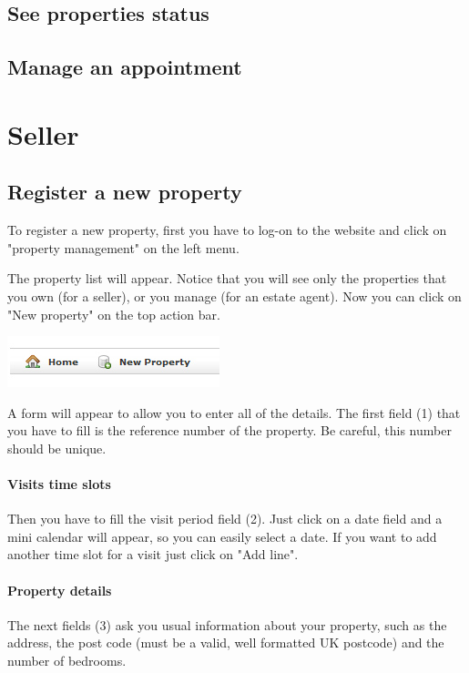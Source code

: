 \documentclass[a4paper,12pt]{article}
\begin{document}
\subsection{See properties status}
\subsection{Manage an appointment}

\section{Seller}
\subsection{Register a new property}
To register a new property, first you have to log-on to the website and click on "property management" on the left menu.

The property list will appear. Notice that you will see only the properties that you own (for a seller), or you manage (for an estate agent).
Now you can click on "New property" on the top action bar.
\begin{center}
\includegraphics[scale=0.7]{pics/new_property.jpg}
\end{center}


A form will appear to allow you to enter all of the details. The first field (1) that you have to fill is the reference number of the property. Be careful, this number should be unique.

\paragraph{Visits time slots}

Then you have to fill the visit period field (2).
Just click on a date field and a mini calendar will appear, so you can easily select a date.
If you want to add another time slot for a visit just click on "Add line".

\paragraph{Property details}

The next fields (3) ask you usual information about your property, such as the address, the post code (must be a valid, well formatted UK postcode) and the number of bedrooms.
\end{document}
